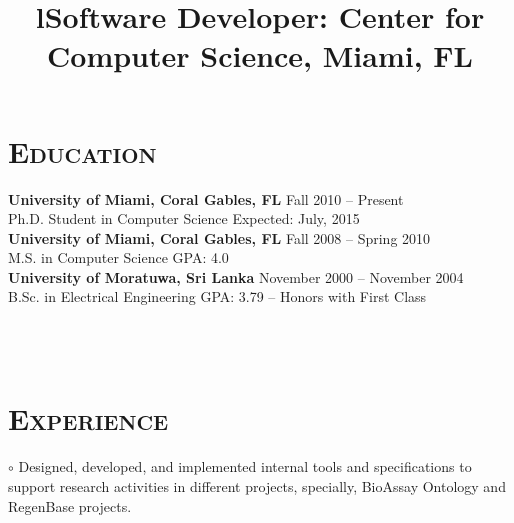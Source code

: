 \begin{resume}



\vspace{-5mm}
\section{\textsc{Education}}

\textbf{University of Miami, Coral Gables, FL} \hfill Fall 2010 -- Present \\
Ph.D. Student in Computer Science \hfill Expected: July, 2015 \\
\newline
\textbf{University of Miami, Coral Gables, FL} \hfill Fall 2008 -- Spring 2010 \\
M.S. in Computer Science \hfill GPA: 4.0 \\
\newline
\textbf{University of Moratuwa, Sri Lanka} \hfill November 2000 -- November 2004 \\ 
B.Sc. in Electrical Engineering \hfill GPA: 3.79 -- Honors with
First Class




\begin{formatb}
  \title{l}\\
  \body\\
\end{formatb}

\vspace{-2mm}
\section{\textsc{Experience}}

\title{\textbf{Software Developer:  Center for Computer Science, Miami, FL}}
\begin{position}
$\circ$ Designed, developed, and implemented internal tools and specifications to support research 
activities in different projects, specially, BioAssay Ontology and RegenBase projects.
\end{position}


\end{resume}
